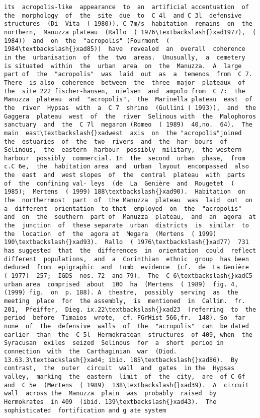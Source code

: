 \documentclass[11pt]{article}
\begin{document}
\begin{Verbatim}[commandchars=\\\{\}]
its  acropolis-like  appearance  to  an  artificial accentuation  of  the  morphology  of  the  site  due  to  C 4l  and C 3l  defensive  structures  (Di  Vita  ( 1980)). C 7m/s  habitation  remains  on  the  northern,  Manuzza plateau  (Rallo  ( 1976\textbackslash{}xad1977),  ( 1984))  and  on  the  "acropolis" (Fourmont  ( 1984\textbackslash{}xad85))  have  revealed  an  overall  coherence  in the  urbanisation  of  the  two  areas.  Unusually,  a  cemetery  is situated  within  the  urban  area  on  the  Manuzza.  A  large  part of  the  "acropolis"  was  laid  out  as  a  temenos  from  C 7.  There  is also  coherence  between  the  three  major  plateaux  of  the  site 222 fischer-hansen,  nielsen  and  ampolo from  C 7:  the  Manuzza  plateau  and  "acropolis",  the  Marinella plateau  east  of  the  river  Hypsas  with  a  C 7  shrine  (Gullini ( 1993)),  and  the  Gaggera  plateau  west  of  the  river  Selinous with  the  Malophoros  sanctuary  and  the  C 7l  megaron (Romeo  ( 1989)  40,no.  64).  The  main  east\textbackslash{}xadwest  axis  on  the "acropolis"joined  the  estuaries  of  the  two  rivers  and  the  har- bours  of  Selinous,  the  eastern  harbour  possibly  military,  the western  harbour  possibly  commercial. In  the  second  urban  phase,  from  c.C 6e,  the  habitation area  and  urban  layout  encompassed  also  the  east  and  west slopes  of  the  central  plateau  with  parts  of  the  confining val- leys  (de  La  Genière  and  Rougetet  ( 1985);  Mertens  ( 1999) 188\textbackslash{}xad90).  Habitation  on  the  northernmost  part  of  the Manuzza  plateau  was  laid  out  on  a  different  orientation  to that  employed  on  the  "acropolis"  and  on  the  southern  part of  Manuzza  plateau,  and  an  agora  at  the  junction  of  these separate  urban  districts  is  similar  to  the  location  of  the  agora at  Megara  (Mertens  ( 1999)  190\textbackslash{}xad93).  Rallo  ( 1976\textbackslash{}xad77)  731  has suggested  that  the  differences  in  orientation  could  reflect different  populations,  and  a  Corinthian  ethnic  group  has been  deduced  from  epigraphic  and  tomb  evidence  (cf.  de  La Genière  ( 1977)  257;  IGDS  nos. 72  and 79).  The  C 6\textbackslash{}xadC5  urban area  comprised  about  100  ha  (Mertens  ( 1989)  fig. 4,(1999) fig.  on  p. 188). A  theatre,  possibly  serving  as  the  meeting  place  for  the assembly,  is  mentioned  in  Callim.  fr. 201,  Pfeiffer,  Dieg. ix.22\textbackslash{}xad23  (referring  to  the  period  before  Timaios  wrote,  cf. FGrHist 566,fr.  148). So  far  none  of  the  defensive  walls  of  the  "acropolis"  can  be dated  earlier  than  the  C 5l  Hermokratean  structures  of 409, when  the  Syracusan  exiles  seized  Selinous  for  a  short  period in  connection  with  the  Carthaginian  war  (Diod. 13.63.3\textbackslash{}xad4; ibid. 185\textbackslash{}xad86).  By  contrast,  the  outer  circuit  wall  and  gates  in the  Hypsas  valley,  marking  the  eastern  limit  of  the  city,  are  of C 6f  and  C 5e  (Mertens  ( 1989)  138\textbackslash{}xad39).  A  circuit  wall  across the  Manuzza  plain  was  probably  raised  by  Hermokrates  in 409  (ibid. 139\textbackslash{}xad43).  The  sophisticated  fortification and g ate system 
\end{Verbatim}
\end{document}

